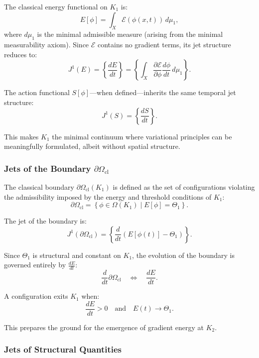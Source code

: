 The classical energy functional on $K_1$ is:
\[
E[\phi] = \int_X \mathcal{E}(\phi(x,t))\, d\mu_1,
\]
where $d\mu_1$ is the minimal admissible measure (arising from the
minimal measurability axiom). Since $\mathcal{E}$ contains no gradient
terms, its jet structure reduces to:
\[
J^1(E) = \left\{ \frac{dE}{dt} \right\}
=
\left\{
\int_X
\frac{\partial\mathcal{E}}{\partial\phi}
\frac{d\phi}{dt}\,
d\mu_1
\right\}.
\]

The action functional $S[\phi]$---when defined---inherits the same
temporal jet structure:
\[
J^1(S) = \left\{ \frac{dS}{dt} \right\}.
\]

This makes $K_1$ the minimal continuum where variational principles can
be meaningfully formulated, albeit without spatial structure.



\subsubsection{Jets of the Boundary \texorpdfstring{$\partial\Omega_{\mathrm{cl}}$}{Boundary}}

The classical boundary $\partial\Omega_{\mathrm{cl}}(K_1)$ is defined as
the set of configurations violating the admissibility imposed by the
energy and threshold conditions of $K_1$:
\[
\partial\Omega_{\mathrm{cl}} = \left\{ \phi\in\Omega(K_1) \mid E[\phi] = \Theta_1 \right\}.
\]

The jet of the boundary is:
\[
J^1(\partial\Omega_{\mathrm{cl}})
=
\left\{
\frac{d}{dt}\left(E[\phi(t)]-\Theta_1\right)
\right\}.
\]

Since $\Theta_1$ is structural and constant on $K_1$, the evolution of
the boundary is governed entirely by $\frac{dE}{dt}$:
\[
\frac{d}{dt}\partial\Omega_{\mathrm{cl}}
\quad\Longleftrightarrow\quad
\frac{dE}{dt}.
\]

A configuration exits $K_1$ when:
\[
\frac{dE}{dt} > 0
\quad\text{and}\quad
E(t) \to \Theta_1.
\]

This prepares the ground for the emergence of gradient energy at $K_2$.



\subsubsection{Jets of Structural Quantities}

